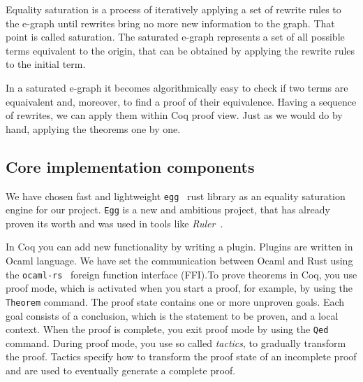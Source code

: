 Equality saturation is a process of iteratively applying a set of rewrite rules to the e-graph until rewrites bring no more new information to the graph. That point is called saturation. The saturated e-graph represents a set of all possible terms  equivalent to the origin, that can be obtained by applying the rewrite rules to the initial term.

In a saturated e-graph it becomes algorithmically easy to check if two terms are equaivalent and, moreover, to find a proof of their equivalence. Having a sequence of rewrites, we can apply them within Coq proof view. Just as we would do by hand, applying the theorems one by one.

\subsection{Core implementation components}

We have chosen fast and lightweight \texttt{egg}~\cite{egg} rust library as an equality saturation engine for our project. \texttt{Egg} is a new and ambitious project, that has already proven its worth and was used in tools like \textit{Ruler}~\cite{ruler}. 

In Coq you can add new functionality by writing a plugin. Plugins are written in Ocaml language. We have set the communication between Ocaml and Rust using the \texttt{ocaml-rs}~\cite{ocaml_rust_ffi} foreign function interface (FFI).\@ To prove theorems in Coq, you use proof mode, which is activated when you start a proof, for example, by using the \texttt{Theorem} command. The proof state contains one or more unproven goals. Each goal consists of a conclusion, which is the statement to be proven, and a local context. When the proof is complete, you exit proof mode by using the \texttt{Qed} command. During proof mode, you use so called \textit{tactics}, to gradually transform the proof. Tactics specify how to transform the proof state of an incomplete proof and are used to eventually generate a complete proof.

